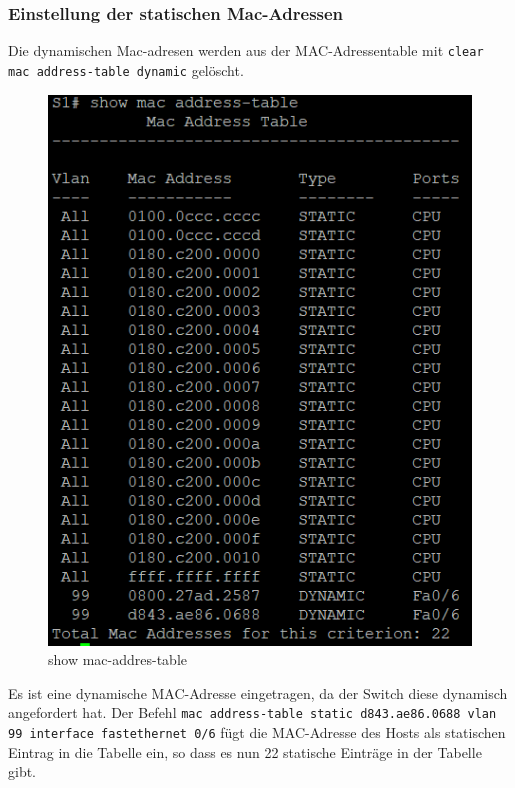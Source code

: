 \documentclass[a4paper]{article}
\newcommand{\abc}{\hfill \break}
\begin{document}
\subsubsection{Einstellung der statischen Mac-Adressen}
Die dynamischen Mac-adresen werden aus der MAC-Adressentable mit \texttt{clear mac address-table dynamic} gelöscht.\abc
\begin{figure}[h]
	\centering
	\includegraphics[scale=0.4]{images/uesdghdsughdsg.png}
	\caption{show mac-addres-table}
\end{figure}\abc
Es ist eine dynamische MAC-Adresse eingetragen, da der Switch diese dynamisch angefordert hat. \abc
Der Befehl \texttt{mac address-table static d843.ae86.0688 vlan 99 interface fastethernet 0/6} fügt die MAC-Adresse des Hosts als statischen Eintrag in die Tabelle ein, so dass es nun 22 statische Einträge in der Tabelle gibt.\abc
\end{document}
